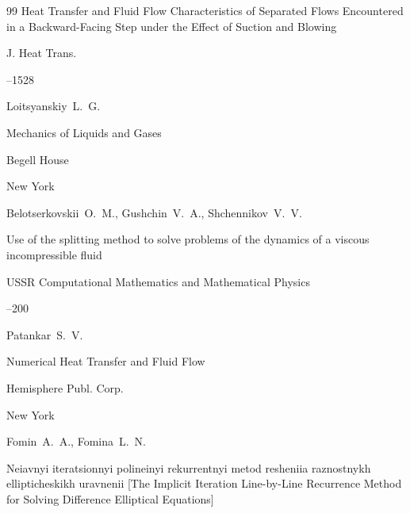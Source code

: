 \begin{thebibliography}{99}
\paper Heat Transfer and Fluid Flow Characteristics of Separated Flows Encountered in a Backward-Facing Step under the Effect of Suction and Blowing

\jour J. Heat Trans.




--1528





\by Loitsyanskiy~L.~G.

\book Mechanics of Liquids and Gases

\publ Begell House

\publaddr New York








\by Belotserkovskii~O.~M., Gushchin~V.~A., Shchennikov~V.~V.

\paper Use of the splitting method to solve problems of the dynamics of a viscous incompressible fluid

\jour USSR Computational Mathematics and Mathematical Physics




--200





\by Patankar~S.~V.

\book Numerical Heat Transfer and Fluid Flow

\publ Hemisphere Publ. Corp.

\publaddr New York








\by Fomin~A.~A., Fomina~L.~N.

\book Neiavnyi iteratsionnyi polineinyi rekurrentnyi metod resheniia raznostnykh ellipticheskikh uravnenii \rm [The Implicit Iteration Line-by-Line Recurrence Method for Solving Difference Elliptical Equations]


\end{thebibliography}
